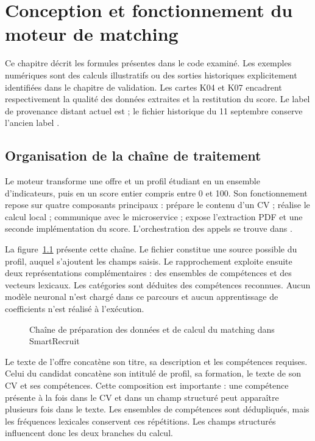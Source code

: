\chapter{Conception et fonctionnement du moteur de matching}
\label{chap:moteur}

Ce chapitre décrit les formules présentes dans le code examiné. Les exemples numériques sont des calculs illustratifs ou des sorties historiques explicitement identifiées dans le chapitre de validation. Les cartes K04 et K07 encadrent respectivement la qualité des données extraites et la restitution du score. Le label de provenance distant actuel est  ; le fichier historique du 11 septembre conserve l'ancien label .

\section{Organisation de la chaîne de traitement}

Le moteur transforme une offre et un profil étudiant en un ensemble d'indicateurs, puis en un score entier compris entre 0 et 100. Son fonctionnement repose sur quatre composants principaux :  prépare le contenu d'un CV ;  réalise le calcul local ;  communique avec le microservice ;  expose l'extraction PDF et une seconde implémentation du score. L'orchestration des appels se trouve dans .

La figure~\ref{fig:matching-pipeline} présente cette chaîne. Le fichier constitue une source possible du profil, auquel s'ajoutent les champs saisis. Le rapprochement exploite ensuite deux représentations complémentaires : des ensembles de compétences et des vecteurs lexicaux. Les catégories sont déduites des compétences reconnues. Aucun modèle neuronal n'est chargé dans ce parcours et aucun apprentissage de coefficients n'est réalisé à l'exécution.

\begin{figure}[H]
\centering

\caption{Chaîne de préparation des données et de calcul du matching dans SmartRecruit}
\label{fig:matching-pipeline}
\end{figure}

Le texte de l'offre concatène son titre, sa description et les compétences requises. Celui du candidat concatène son intitulé de profil, sa formation, le texte de son CV et ses compétences. Cette composition est importante : une compétence présente à la fois dans le CV et dans un champ structuré peut apparaître plusieurs fois dans le texte. Les ensembles de compétences sont dédupliqués, mais les fréquences lexicales conservent ces répétitions. Les champs structurés influencent donc les deux branches du calcul.

